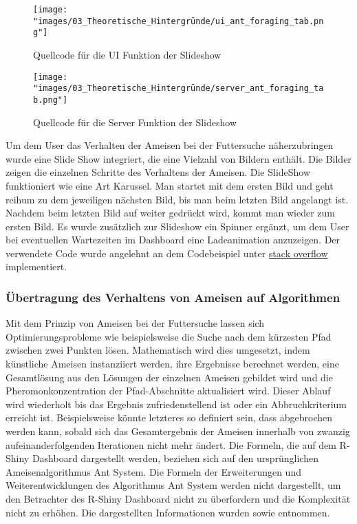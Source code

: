 \begin{figure}[h]
 \centering
 \texttt{[image: "images/03\_Theoretische\_Hintergründe/ui\_ant\_foraging\_tab.png"]}
 \caption{Quellcode für die UI Funktion der Slideshow}
 \label{fig:ui_ant_foraging_tab}
\end{figure}

\begin{figure}[h]
 \centering
 \texttt{[image: "images/03\_Theoretische\_Hintergründe/server\_ant\_foraging\_tab.png"]}
 \caption{Quellcode für die Server Funktion der Slideshow}
 \label{fig:server_ant_foraging_tab}
\end{figure}

Um dem User das Verhalten der Ameisen bei der Futtersuche näherzubringen wurde eine Slide Show integriert, die eine Vielzahl von Bildern enthält. Die Bilder zeigen die einzelnen Schritte des Verhaltens der Ameisen. Die SlideShow funktioniert wie eine Art Karussel. Man startet mit dem ersten Bild und geht reihum zu dem jeweiligen nächsten Bild, bis man beim letzten Bild angelangt ist. Nachdem beim letzten Bild auf weiter gedrückt wird, kommt man wieder zum ersten Bild.
Es wurde zusätzlich zur Slideshow ein Spinner ergänzt, um dem User bei eventuellen Wartezeiten im Dashboard eine Ladeanimation anzuzeigen. Der verwendete Code wurde angelehnt an dem Codebeispiel unter  \href{https://stackoverflow.com/questions/51531743/image-slideshow-in-r-shiny}{stack overflow} implementiert.

\subsubsection{Übertragung des Verhaltens von Ameisen auf Algorithmen} \label{chap:Formeln}
Mit dem Prinzip von Ameisen bei der Futtersuche lassen sich Optimierungsprobleme wie beispielsweise die Suche nach dem kürzesten Pfad zwischen zwei Punkten lösen. Mathematisch wird dies umgesetzt, indem künstliche Ameisen instanziiert werden, ihre Ergebnisse berechnet werden, eine Gesamtlösung aus den Lösungen der einzelnen Ameisen gebildet wird und die Pheromonkonzentration der Pfad-Abschnitte aktualisiert wird. Dieser Ablauf wird wiederholt bis das Ergebnis zufriedenstellend ist oder ein Abbruchkriterium erreicht ist. Beispielsweise könnte letzteres so definiert sein, dass abgebrochen werden kann, sobald sich das Gesamtergebnis der Ameisen innerhalb von zwanzig aufeinanderfolgenden Iterationen nicht mehr ändert.\citep{Pyl2008} \newline
    Die Formeln, die auf dem R-Shiny Dashboard dargestellt werden, beziehen sich auf den ursprünglichen Ameisenalgorithmus Ant System. Die Formeln der Erweiterungen und Weiterentwicklungen des Algorithmus Ant System werden nicht dargestellt, um den Betrachter des R-Shiny Dashboard nicht zu überfordern und die Komplexität nicht zu erhöhen. Die dargestellten Informationen wurden \cite{Pyl2008} sowie \cite[S. 20-30]{Graf.2003} entnommen. 

